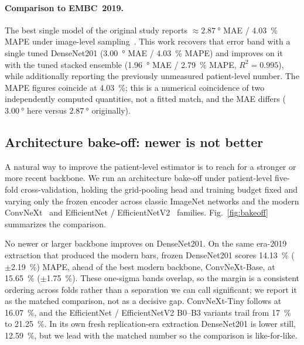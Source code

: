 \paragraph{Comparison to EMBC~2019.} The best single model of the original study reports $\approx\!\SI{2.87}{\degree}$ MAE / \SI{4.03}{\percent} MAPE under image-level sampling~\citep{Patil2019}. This work recovers that error band with a single tuned DenseNet201 (\SI{3.00}{\degree} MAE / \SI{4.03}{\percent} MAPE) and improves on it with the tuned stacked ensemble (\SI{1.96}{\degree} MAE / \SI{2.79}{\percent} MAPE, $R^2=0.995$), while additionally reporting the previously unmeasured patient-level number. The MAPE figures coincide at \SI{4.03}{\percent}; this is a numerical coincidence of two independently computed quantities, not a fitted match, and the MAE differs ($\SI{3.00}{\degree}$ here versus $\SI{2.87}{\degree}$ originally).

\subsection{Architecture bake-off: newer is not better}
\label{subsec:bakeoff}

A natural way to improve the patient-level estimator is to reach for a stronger or more recent backbone. We run an architecture bake-off under patient-level five-fold cross-validation, holding the grid-pooling head and training budget fixed and varying only the frozen encoder across classic ImageNet networks and the modern ConvNeXt~\citep{Liu2022} and EfficientNet / EfficientNetV2~\citep{Tan2019} families. Fig.~\ref{fig:bakeoff} summarizes the comparison.

No newer or larger backbone improves on DenseNet201. On the same era-2019 extraction that produced the modern bars, frozen DenseNet201 scores \SI{14.13}{\percent} ($\pm$\SI{2.19}{\percent}) MAPE, ahead of the best modern backbone, ConvNeXt-Base, at \SI{15.65}{\percent} ($\pm$\SI{1.75}{\percent}). These one-sigma bands overlap, so the margin is a consistent ordering across folds rather than a separation we can call significant; we report it as the matched comparison, not as a decisive gap. ConvNeXt-Tiny follows at \SI{16.07}{\percent}, and the EfficientNet / EfficientNetV2 B0--B3 variants trail from \SI{17}{\percent} to \SI{21.25}{\percent}. In its own fresh replication-era extraction DenseNet201 is lower still, \SI{12.59}{\percent}, but we lead with the matched number so the comparison is like-for-like.


